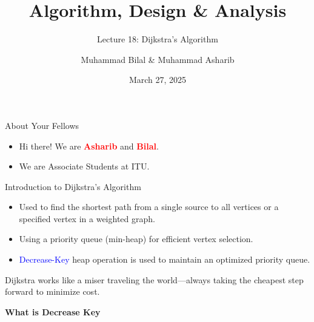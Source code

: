 \documentclass{beamer}
\title{Algorithm, Design \& Analysis}
\subtitle{\textcolor{white!70}{Lecture 18: Dijkstra’s Algorithm}}
\author{{ Muhammad Bilal    \&    Muhammad Asharib }}
\institute{Information Technology University}
\date{March 27, 2025}
\begin{document}
\begin{frame}
    \titlepage
\end{frame}

\begin{frame}{About Your Fellows}
        \begin{itemize}
            \item Hi there! We are \textcolor{red}{\textbf{Asharib}} {and }\textcolor{red}{\textbf {Bilal}}.
            \item We are Associate Students at ITU.
        \end{itemize}
\end{frame}

\begin{frame}{Introduction to Dijkstra’s Algorithm}
    \begin{itemize}
        \item Used to find the shortest path from a single source to all vertices or a specified vertex in a weighted graph.
        \item Using a priority queue (min-heap) for efficient vertex selection.
        \item {\textcolor{blue}{Decrease-Key} heap operation is used to maintain an optimized priority queue.}
    \end{itemize}
    

    \vfill %
    \hfill %
    \begin{minipage}{7cm}
        \begin{tcolorbox}[
            colback=gray!10,
            colframe=black!60,
            boxrule=0.5pt,
            width=6.5cm,
            halign=left
        ]
            \small Dijkstra works like a miser traveling the world—always taking the cheapest step forward to minimize cost.
        \end{tcolorbox}
    \end{minipage}
    
\end{frame}

\begin{frame}
    \centering
         \begin{tcolorbox}[
        colback=white, colframe=gray!20, boxrule=2mm, arc=5mm,
        width=0.8\textwidth]
     \centering
    \Large\textbf{\textcolor{customred}{What is Decrease Key}}
    \end{tcolorbox}
\end{frame}
\end{document}
